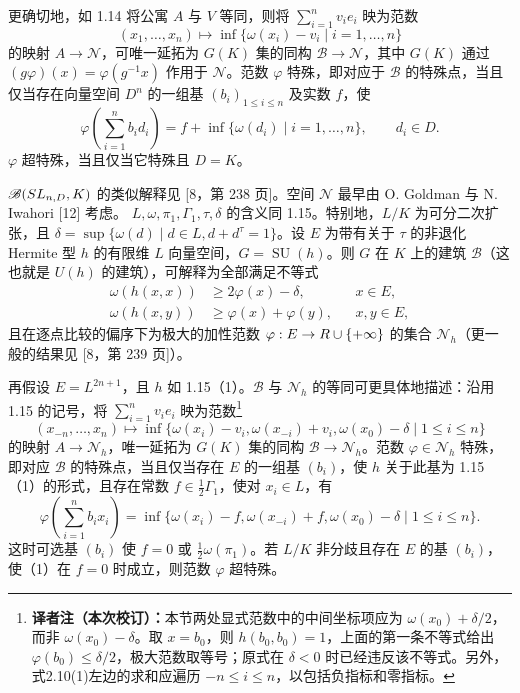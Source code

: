 更确切地，如 1.14 将公寓 $A$ 与 $V$ 等同，则将 $\sum_{i=1}^nv_ie_i$ 映为范数
\[
(x_1,\ldots,x_n)\longmapsto\inf\{\omega(x_i)-v_i\mid i=1,\ldots,n\}
\]
的映射 $A\to\mathcal N$，可唯一延拓为 $G(K)$ 集的同构 $\mathscr B\to\mathcal N$，其中 $G(K)$ 通过 $(g\varphi)(x)=\varphi(g^{-1}x)$ 作用于 $\mathcal N$。范数 $\varphi$ 特殊，即对应于 $\mathscr B$ 的特殊点，当且仅当存在向量空间 $D^n$ 的一组基 $(b_i)_{1\leq i\leq n}$ 及实数 $f$，使
\[
\varphi\left(\sum_{i=1}^nb_id_i\right)=f+\inf\{\omega(d_i)\mid i=1,\ldots,n\},\qquad d_i\in D.
\]
$\varphi$ 超特殊，当且仅当它特殊且 $D=K$。

$\mathscr B(SL_{n,D},K)$ 的类似解释见 [8，第 238 页]。空间 $\mathcal N$ 最早由 O. Goldman 与 N. Iwahori [12] 考虑。
$L,\omega,\pi_1,\Gamma_1,\tau,\delta$ 的含义同 1.15。特别地，$L/K$ 为可分二次扩张，且 $\delta=\sup\{\omega(d)\mid d\in L,d+d^\tau=1\}$。设 $E$ 为带有关于 $\tau$ 的非退化 Hermite 型 $h$ 的有限维 $L$ 向量空间，$G=\operatorname{SU}(h)$。则 $G$ 在 $K$ 上的建筑 $\mathscr B$（这也就是 $U(h)$ 的建筑），可解释为全部满足不等式
\[
\begin{aligned}
\omega(h(x,x))&\geq2\varphi(x)-\delta,&&x\in E,\\
\omega(h(x,y))&\geq\varphi(x)+\varphi(y),&&x,y\in E,
\end{aligned}
\]
且在逐点比较的偏序下为极大的加性范数 $\varphi:E\to R\cup\{+\infty\}$ 的集合 $\mathcal N_h$（更一般的结果见 [8，第 239 页]）。

再假设 $E=L^{2n+1}$，且 $h$ 如 1.15（1）。$\mathscr B$ 与 $\mathcal N_h$ 的等同可更具体地描述：沿用 1.15 的记号，将 $\sum_{i=1}^nv_ie_i$ 映为范数\nobreak\footnote{\textbf{译者注（本次校订）：}本节两处显式范数中的中间坐标项应为 $\omega(x_0)+\delta/2$，而非 $\omega(x_0)-\delta$。取 $x=b_0$，则 $h(b_0,b_0)=1$，上面的第一条不等式给出 $\varphi(b_0)\le\delta/2$，极大范数取等号；原式在 $\delta<0$ 时已经违反该不等式。另外，式2.10(1)左边的求和应遍历 $-n\le i\le n$，以包括负指标和零指标。}
\[
(x_{-n},\ldots,x_n)\longmapsto
\inf\{\omega(x_i)-v_i,\omega(x_{-i})+v_i,\omega(x_0)-\delta\mid1\leq i\leq n\}
\]
的映射 $A\to\mathcal N_h$，唯一延拓为 $G(K)$ 集的同构 $\mathscr B\to\mathcal N_h$。范数 $\varphi\in\mathcal N_h$ 特殊，即对应 $\mathscr B$ 的特殊点，当且仅当存在 $E$ 的一组基 $(b_i)$，使 $h$ 关于此基为 1.15（1）的形式，且存在常数 $f\in\frac12\Gamma_1$，使对 $x_i\in L$，有
\[
\varphi\left(\sum_{i=1}^nb_ix_i\right)=
\inf\{\omega(x_i)-f,\omega(x_{-i})+f,\omega(x_0)-\delta\mid1\leq i\leq n\}.\tag{2.10(1)}
\]
这时可选基 $(b_i)$ 使 $f=0$ 或 $\frac12\omega(\pi_1)$。若 $L/K$ 非分歧且存在 $E$ 的基 $(b_i)$，使（1）在 $f=0$ 时成立，则范数 $\varphi$ 超特殊。
